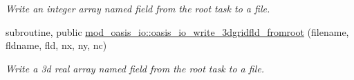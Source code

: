 \begin{DoxyCompactItemize}
\begin{DoxyCompactList}\small\item\em Write an integer array named field from the root task to a file. \end{DoxyCompactList}\item 
subroutine, public \hyperlink{namespacemod__oasis__io_aa967e930e5d6199bbc6ec9a4f3c7069e}{mod\+\_\+oasis\+\_\+io\+::oasis\+\_\+io\+\_\+write\+\_\+3dgridfld\+\_\+fromroot} (filename, fldname, fld, nx, ny, nc)
\begin{DoxyCompactList}\small\item\em Write a 3d real array named field from the root task to a file. \end{DoxyCompactList}\end{DoxyCompactItemize}
